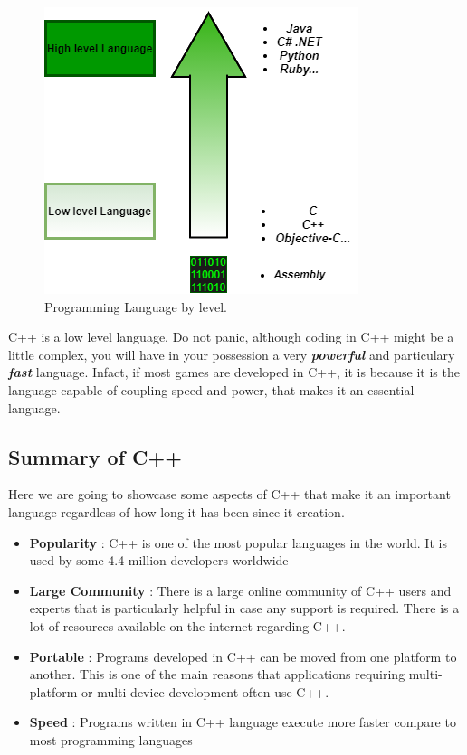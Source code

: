 \documentclass[11pt, a4paper]{article}
\begin{document}
\begin{figure}[h!]
    \includegraphics[width = \linewidth]{diagrams/low vs high.png}
    \caption{Programming Language by level.}
    \label{fig:Programming Language by level}
\end{figure}
C++ is a low level language. Do not panic, although coding in C++ might be a little complex, you will 
have in your possession a very \textbf{\textit{{powerful}}} and particulary \textbf{\textit{{fast}}} language.
Infact, if most games are developed in C++, it is because it is the language capable of coupling
speed and power, that makes it an essential language.



\subsection{Summary of C++}
Here we are going to showcase some aspects of C++ that make it an important language regardless of
how long it has been since it creation.
\begin{itemize}
    \item \textbf{Popularity} : C++ is one of the most popular
    languages in the world. It is used by some 4.4 million developers worldwide
    \item \textbf{Large Community} : There is a large online community
    of C++ users and experts that is particularly helpful in case any support is required.
    There is a lot of resources available on the internet regarding C++.
    \item \textbf{Portable} : Programs developed in C++ can be moved from one platform
    to another. This is one of the main reasons that applications requiring multi-platform
    or multi-device development often use C++.
    \item  \textbf{Speed} : Programs written in C++ language execute more faster compare
    to most programming languages\end{itemize}
\end{document}
